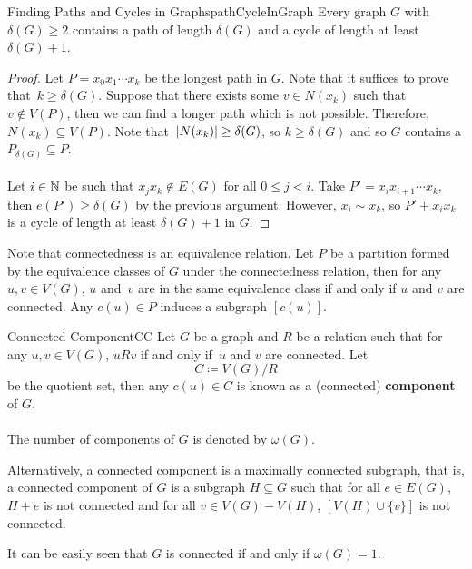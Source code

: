 \documentclass[math, code]{amznotes}
\theoremstyle{remark}
\begin{document}
\begin{probox}{Finding Paths and Cycles in Graphs}{pathCycleInGraph}
    Every graph $G$ with $\delta(G) \geq 2$ contains a path of length $\delta(G)$ and a cycle of length at least $\delta(G) + 1$.
    \tcblower
    \begin{proof}
        Let $P = x_0x_1\cdots x_k$ be the longest path in $G$. Note that it suffices to prove that~$k \geq \delta(G)$. Suppose that there exists some $v \in N(x_k)$ such that $v \notin V(P)$, then we can find a longer path which is not possible. Therefore, $N(x_k) \subseteq V(P)$. Note that~${\left\lvert {N(x_k)} \right\rvert} \geq \delta(G)$, so $k \geq \delta(G)$ and so $G$ contains a $P_{\delta(G)} \subseteq P$.
        \\\\
        Let $i \in \mathbb{N}$ be such that $x_jx_k \notin E(G)$ for all $0 \leq j < i$. Take $P' = x_ix_{i + 1}\cdots x_k$, then $e(P') \geq \delta(G)$ by the previous argument. However, $x_i \sim x_k$, so $P' + x_ix_k$ is a cycle of length at least $\delta(G) + 1$ in $G$.
    \end{proof}
\end{probox}
Note that connectedness is an equivalence relation. Let $P$ be a partition formed by the equivalence classes of $G$ under the connectedness relation, then for any $u, v \in V(G)$, $u$ and~$v$ are in the same equivalence class if and only if $u$ and $v$ are connected. Any $c(u) \in P$ induces a subgraph $[c(u)]$.
\begin{dfnbox}{Connected Component}{CC}
    Let $G$ be a graph and $R$ be a relation such that for any $u, v \in V(G)$, $uRv$ if and only if~$u$ and $v$ are connected. Let
    \begin{equation*}
        C \coloneqq V(G)/R
    \end{equation*}
    be the quotient set, then any $c(u) \in C$ is known as a (connected) {\color{red} \textbf{component}} of $G$.
    \\\\
    The number of components of $G$ is denoted by $\omega(G)$.
\end{dfnbox}
Alternatively, a connected component is a maximally connected subgraph, that is, a connected component of $G$ is a subgraph $H \subseteq G$ such that for all $e \in E(G)$, $H + e$ is not connected and for all $v \in V(G) - V(H)$, $\left[V(H) \cup \{v\}\right]$ is not connected.

It can be easily seen that $G$ is connected if and only if $\omega(G) = 1$.
\end{document}
